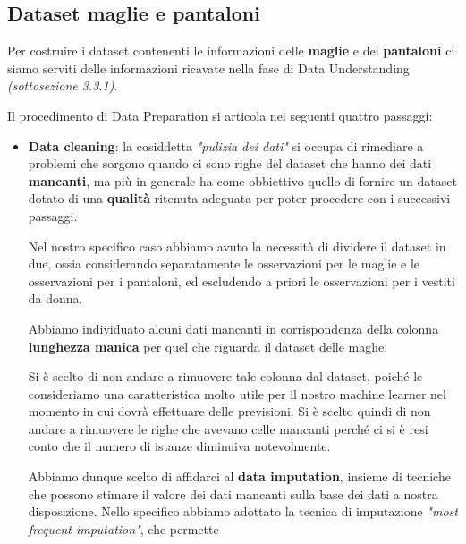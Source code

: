 \documentclass[a4paper, 11pt, oneside]{report}
\begin{document}
                \subsection{Dataset maglie e pantaloni}
                Per costruire i dataset contenenti le informazioni delle \textbf{maglie} e dei \textbf{pantaloni} ci siamo serviti delle
                informazioni ricavate nella fase di Data Understanding \textit{(sottosezione 3.3.1)}.
                \\
                \par \noindent Il procedimento di Data Preparation si articola nei seguenti quattro passaggi:
                \begin{itemize}
                    \item \textbf{Data cleaning}: la cosiddetta \textit{"pulizia dei dati"} si occupa di
                    rimediare a problemi che sorgono quando ci sono righe del dataset che hanno dei dati \textbf{mancanti}, ma più
                    in generale ha come obbiettivo quello di fornire un dataset dotato di una \textbf{qualità} ritenuta adeguata
                    per poter procedere con i successivi passaggi.
                    \par \noindent Nel nostro specifico caso abbiamo avuto la necessità di dividere il dataset \cite{6} in
                    due, ossia considerando separatamente le osservazioni per le maglie e le osservazioni per i pantaloni,
                    ed escludendo a priori le osservazioni per i vestiti da donna.
                    \par \noindent Abbiamo individuato alcuni dati mancanti in corrispondenza della
                    colonna \textbf{lunghezza manica} per quel che riguarda il dataset delle maglie.
                    \par \noindent Si è scelto di non andare a rimuovere tale colonna dal dataset, poiché le consideriamo una caratteristica
                    molto utile per il nostro machine learner nel momento in cui dovrà effettuare delle previsioni.
                    Si è scelto quindi di non andare a rimuovere le righe che avevano celle mancanti
                    perché ci si è resi conto che il numero di istanze diminuiva notevolmente.
                    \par \noindent Abbiamo dunque scelto di affidarci al \textbf{data imputation}, insieme di tecniche che
                    possono stimare il valore dei dati mancanti sulla base dei dati a nostra disposizione.
                    Nello specifico abbiamo adottato la tecnica di imputazione \textit{"most frequent imputation"}, che permette

\end{itemize}
\end{document}
